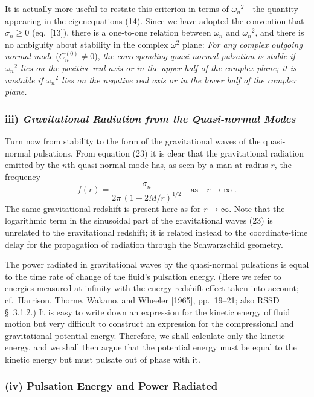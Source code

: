 \documentclass[12pt]{article}
\begin{document}
It is actually more useful to restate this criterion in terms of $\omega_n{}^2$---the quantity appearing in the eigenequations (14). Since we have adopted the convention that $\sigma_n \geq 0$
(eq.\ [13]), there is a one-to-one relation between $\omega_n$ and $\omega_n{}^2$, and there is no ambiguity
about stability in the complex $\omega^2$ plane: \textit{For any complex outgoing normal mode} ($C_n^{(0)} \neq 0$),
\textit{the corresponding quasi-normal pulsation is stable if $\omega_n{}^2$ lies on the positive real axis
or in the upper half of the complex plane; it is unstable if $\omega_n{}^2$ lies on the negative real axis
or in the lower half of the complex plane.}

\subsubsection*{iii) \textit{Gravitational Radiation from the Quasi-normal Modes}}

Turn now from stability to the form of the gravitational waves of the quasi-normal
pulsations. From equation (23) it is clear that the gravitational radiation emitted by
the $n$th quasi-normal mode has, as seen by a man at radius $r$, the frequency
\begin{equation}
  f(r) = \frac{\sigma_n}{2\pi\,(1 - 2M/r)^{1/2}}
         \quad \text{as} \quad r \to \infty \;.
\label{eq:24}
\end{equation}
The same gravitational redshift is present here as for $r \to \infty$. Note that the logarithmic
term in the sinusoidal part of the gravitational waves (23) is unrelated to the gravitational redshift; it is related instead to the coordinate-time delay for the propagation of radiation through the Schwarzschild geometry.

The power radiated in gravitational waves by the quasi-normal pulsations is equal
to the time rate of change of the fluid's pulsation energy. (Here we refer to energies
measured at infinity with the energy redshift effect taken into account; cf.\ Harrison,
Thorne, Wakano, and Wheeler [1965], pp.\ 19--21; also RSSD \S~3.1.2.) It is easy to
write down an expression for the kinetic energy of fluid motion but very difficult to
construct an expression for the compressional and gravitational potential energy.
Therefore, we shall calculate only the kinetic energy, and we shall then argue that the
potential energy must be equal to the kinetic energy but must pulsate out of phase with
it.

\subsubsection{(iv) Pulsation Energy and Power Radiated}
\end{document}
